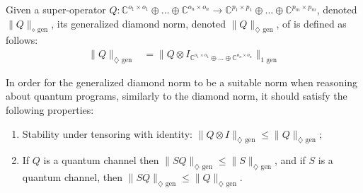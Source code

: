 \begin{definition} \label{def:gen_diamond_norm}
Given a super-operator $Q: \mathbb{C}^{o_1 \times o_1} \oplus \ldots \oplus \mathbb{C}^{o_n \times o_n}  \rightarrow \mathbb{C}^{p_1 \times p_1} \oplus \ldots \oplus  \mathbb{C}^{p_m \times p_m} $, denoted $\|Q\|_{\diamond \text{ gen}}$, its generalized diamond norm, denoted $\|Q\|_{\diamondsuit \text{ gen}}$, of is defined as follows:
\begin{equation*}
  \begin{split}
    \lVert Q  \rVert_{\diamondsuit \text{ gen}} & =  \lVert Q \otimes I_{ \mathbb{C}^{o_1 \times o_1} \oplus \ldots \oplus \mathbb{C}^{o_n \times o_n}}  \rVert_{1 \text{ gen}}
  \end{split}
\end{equation*}
\end{definition} 

In order for the generalized diamond norm to be a suitable norm when reasoning about quantum programs, similarly to the diamond norm, it should satisfy the following properties:
\begin{enumerate}
  \item Stability under tensoring with identity: $\|Q \otimes I\|_{\diamondsuit \text{ gen}} \leq \|Q\|_{\diamondsuit \text{ gen}}$;
  \item If $Q$ is a quantum channel then $\lVert S  Q \rVert_{\diamondsuit \text{ gen}} \leq \lVert S \rVert_{\diamondsuit \text{ gen}}$, and if $S$ is a quantum channel, then $\lVert S  Q \rVert_{\diamondsuit \text{ gen}} \leq \lVert Q \rVert_{\diamondsuit \text{ gen}}$.
\end{enumerate}

